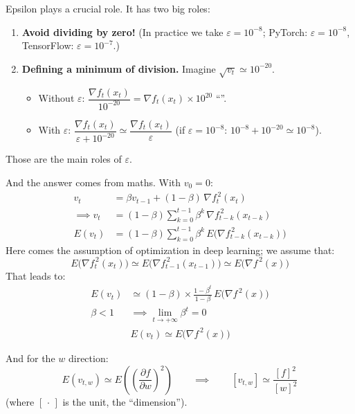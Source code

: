 
Epsilon plays a crucial role. It has two big roles:
\begin{enumerate}[label=\arabic*/]
  \item \textbf{Avoid dividing by zero!} (In practice we take $\varepsilon=10^{-8}$; PyTorch: $\varepsilon=10^{-8}$, TensorFlow: $\varepsilon=10^{-7}$.)
  \item \textbf{Defining a minimum of division.} Imagine $\sqrt{v_{t}}\simeq10^{-20}$.
  \begin{itemize}
    \item Without $\varepsilon$: $\dfrac{\nabla f_t(x_t)}{10^{-20}}=\nabla f_t(x_t)\times10^{20}$ \quad ``''.
    \item With $\varepsilon$: $\dfrac{\nabla f_t(x_t)}{\varepsilon+10^{-20}}\simeq\dfrac{\nabla f_t(x_t)}{\varepsilon}$ \quad (if $\varepsilon=10^{-8}$: $10^{-8}+10^{-20}\simeq10^{-8}$).
  \end{itemize}
\end{enumerate}
Those are the main roles of $\varepsilon$.


And the answer comes from maths. With $v_0=0$:
\begin{align*}
v_t&=\beta v_{t-1}+(1-\beta)\,\nabla f_t^{\,2}(x_t)\\
\implies v_t&=(1-\beta)\sum_{k=0}^{t-1}\beta^k\,\nabla f_{t-k}^{\,2}(x_{t-k})\\
E(v_t)&=(1-\beta)\sum_{k=0}^{t-1}\beta^k\,E\bigl(\nabla f_{t-k}^{\,2}(x_{t-k})\bigr)
\end{align*}
Here comes the assumption of optimization in deep learning; we assume that:
\[
E\bigl(\nabla f_t^{\,2}(x_t)\bigr)\simeq E\bigl(\nabla f_{t-1}^{\,2}(x_{t-1})\bigr)\simeq E\bigl(\nabla f^{\,2}(x)\bigr)
\]
That leads to:
\begin{align*}
E(v_t)&\simeq(1-\beta)\times\frac{1-\beta^t}{1-\beta}\,E\bigl(\nabla f^{\,2}(x)\bigr)\\
\beta<1&\implies\lim_{t\to+\infty}\beta^t=0\\
&\boxed{E(v_t)\simeq E\bigl(\nabla f^{\,2}(x)\bigr)}
\end{align*}

And for the $w$ direction:
\[
E(v_{t,w})\simeq E\left(\left(\frac{\partial f}{\partial w}\right)^2\right)
\qquad\implies\qquad
[v_{t,w}]\simeq\frac{[f]^2}{[w]^2}
\]
(where $[\,\cdot\,]$ is the unit, the ``dimension'').

